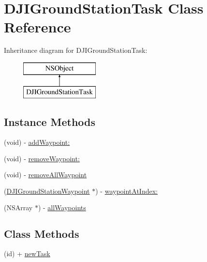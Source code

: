 \hypertarget{interface_d_j_i_ground_station_task}{\section{D\+J\+I\+Ground\+Station\+Task Class Reference}
\label{interface_d_j_i_ground_station_task}
}
Inheritance diagram for D\+J\+I\+Ground\+Station\+Task\+:\begin{figure}[H]
\begin{center}
\leavevmode
\includegraphics[height=2.000000cm]{interface_d_j_i_ground_station_task}
\end{center}
\end{figure}
\subsection*{Instance Methods}
\begin{DoxyCompactItemize}
\item 
(void) -\/ \hyperlink{interface_d_j_i_ground_station_task_a9f1a622c4e3282a17fb27fe0feaecb9a}{add\+Waypoint\+:}
\item 
(void) -\/ \hyperlink{interface_d_j_i_ground_station_task_a451503132beec02466927bb5d9146701}{remove\+Waypoint\+:}
\item 
(void) -\/ \hyperlink{interface_d_j_i_ground_station_task_aa610a5aa7c85236806ff23b3697bca52}{remove\+All\+Waypoint}
\item 
(\hyperlink{interface_d_j_i_ground_station_waypoint}{D\+J\+I\+Ground\+Station\+Waypoint} $\ast$) -\/ \hyperlink{interface_d_j_i_ground_station_task_a9c6413c50d5167dfa3d30d5817a3d7dc}{waypoint\+At\+Index\+:}
\item 
(N\+S\+Array $\ast$) -\/ \hyperlink{interface_d_j_i_ground_station_task_aca78f9db0ae73692c866ae1a4d59795f}{all\+Waypoints}
\end{DoxyCompactItemize}
\subsection*{Class Methods}
\begin{DoxyCompactItemize}
\item 
(id) + \hyperlink{interface_d_j_i_ground_station_task_a326af895810df71c29475d75742fbae6}{new\+Task}
\end{DoxyCompactItemize}
